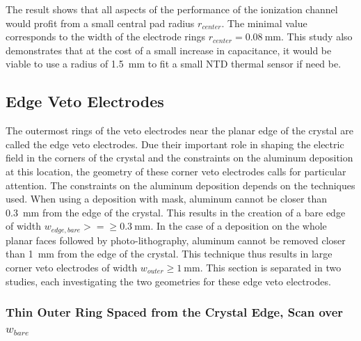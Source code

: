 The result shows that all aspects of the performance of the ionization channel would profit from a small central pad radius $r_{center}$. The minimal value corresponds to the width of the electrode rings $r_{center}=\SI{0.08}{\mm}$. This study also demonstrates that at the cost of a small increase in capacitance, it would be viable to use a radius of \SI{1.5}{\mm} to fit a small NTD thermal sensor if need be.



\subsection{Edge Veto Electrodes}

The outermost rings of the veto electrodes near the planar edge of the crystal are called the edge veto electrodes. Due their important role in shaping the electric field in the corners of the crystal and the constraints on the aluminum deposition at this location, the geometry of these corner veto electrodes calls for particular attention.
The constraints on the aluminum deposition depends on the techniques used. When using a deposition with mask, aluminum cannot be closer than \SI{0.3}{\mm} from the edge of the crystal. This results in the creation of a bare edge of width $w_{edge, bare}>=\geq \SI{0.3}{\mm}$. In the case of a deposition on the whole planar faces followed by photo-lithography, aluminum cannot be removed closer than \SI{1}{\mm} from the edge of the crystal. This technique thus results in large corner veto electrodes of width $w_{outer}\geq \SI{1}{\mm}$.
This section is separated in two studies, each investigating the two geometries for these edge veto electrodes.


\subsubsection{Thin Outer Ring Spaced from the Crystal Edge, Scan over $w_{bare}$}


